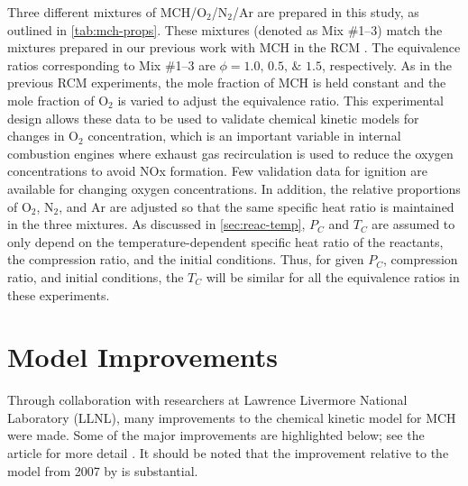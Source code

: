 \documentclass[../main.tex]{subfiles}
\begin{document}
Three different mixtures of MCH/O$_2$/N$_2$/Ar are prepared in this study, as
outlined in \cref{tab:mch-props}. These mixtures (denoted as Mix \#1--3) match the mixtures
prepared in our previous work with MCH in the RCM \cite{Mittal2009}. The equivalence ratios
corresponding to Mix \#1--3 are $\phi=\numlist{1.0;0.5;1.5}$, respectively.
As in the previous RCM experiments, the mole fraction of MCH is held constant
and the mole fraction of O$_2$ is varied to adjust the equivalence ratio. This
experimental design allows these data to be used to validate chemical kinetic
models for changes in O$_2$ concentration, which is an important variable in
internal combustion engines where exhaust gas recirculation is used to reduce
the oxygen concentrations to avoid NOx formation. Few validation data for
ignition are available for changing oxygen concentrations. In addition, the
relative proportions of O$_2$, N$_2$, and Ar are adjusted so that the same specific
heat ratio is maintained in the three mixtures. As discussed in \cref{sec:reac-temp},
$P_C$ and $T_C$ are assumed to only depend on the temperature-dependent
specific heat ratio of the reactants, the compression ratio, and the
initial conditions. Thus, for given $P_C$, compression ratio, and
initial conditions, the $T_C$ will be similar for all the equivalence
ratios in these experiments.

\section{Model Improvements}
\label{sec:mch-model-improvements}

Through collaboration with researchers at Lawrence Livermore National
Laboratory (LLNL), many improvements to the chemical kinetic model for MCH were
made. Some of the major improvements are highlighted below; see the article
for more detail \cite{Weber2014}. It should be noted that the improvement relative to the model
from 2007 by \textcite{Pitz2007} is substantial.
\end{document}
